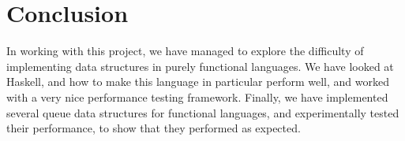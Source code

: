 \section{Conclusion}

In working with this project, we have managed to explore the difficulty of implementing data structures in purely functional languages. 
We have looked at Haskell, and how to make this language in particular perform well, and worked with a very nice performance testing framework.
Finally, we have implemented several queue data structures for functional languages, and experimentally tested their performance, to show that they performed as expected.